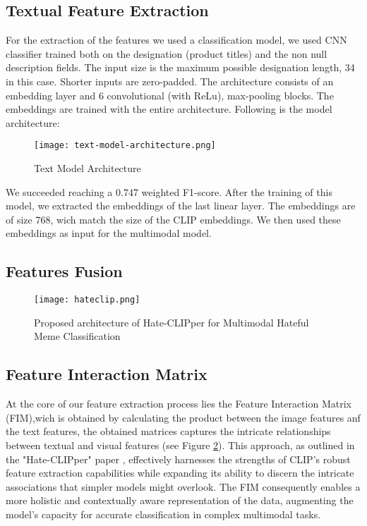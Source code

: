 \subsection{Textual Feature Extraction}

For the extraction of the features we used a classification model, we used CNN classifier trained both on the designation (product titles) and the non null description fields. The input size is the maximum possible designation length, 34 in this case. Shorter inputs are zero-padded. The architecture consists of an embedding layer and 6 convolutional (with ReLu), max-pooling blocks. The embeddings are trained with the entire architecture. Following is the model architecture:

\begin{figure}[H]
    \centering
    \texttt{[image: text-model-architecture.png]}
    \caption{Text Model Architecture}
    \label{fig:text-model}
\end{figure}


We succeeded reaching a 0.747 weighted F1-score. After the training of this model, we extracted the embeddings of the last linear layer. The embeddings are of size 768, wich match the size of the CLIP embeddings. We then used these embeddings as input for the multimodal model.

\subsection{Features Fusion}

\begin{figure}[H]
    \centering
    \texttt{[image: hateclip.png]}
    \caption{\label{fig:hateclipper} Proposed architecture of Hate-CLIPper for Multimodal Hateful Meme Classification}

\end{figure}

\subsection{Feature Interaction Matrix}

At the core of our feature extraction process lies the Feature Interaction Matrix (FIM),wich is obtained by calculating the product between the image features anf the text features, the obtained matrices captures the intricate relationships between textual and visual features (see Figure \ref{fig:hateclipper}). This approach, as outlined in the "Hate-CLIPper" paper \cite{kumar2022hateclipper}, effectively harnesses the strengths of CLIP's robust feature extraction capabilities while expanding its ability to discern the intricate associations that simpler models might overlook. The FIM consequently enables a more holistic and contextually aware representation of the data, augmenting the model's capacity for accurate classification in complex multimodal tasks.


